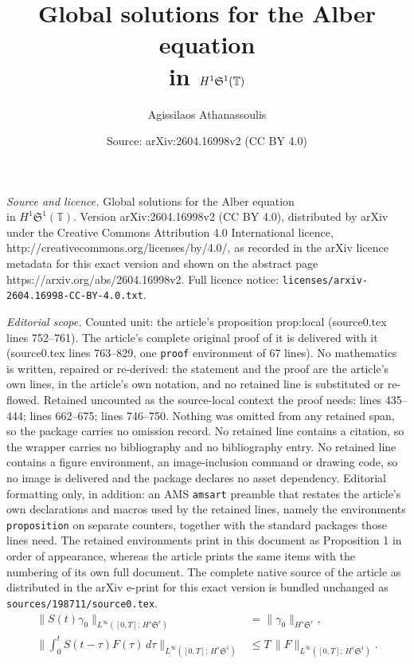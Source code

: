 \documentclass[10pt,a4paper]{amsart}
\title{Global solutions for the Alber equation \\ in $H^1\Sp^1(\mathbb{T})$}
\author{Agissilaos Athanassoulis}
\date{Source: arXiv:2604.16998v2 (CC BY 4.0)}
\newcommand{\Sp}{\mathfrak{S}}
\begin{document}
\maketitle

\noindent\emph{Source and licence.} Global solutions for the Alber equation \\ in $H^1\Sp^1(\mathbb{T})$. Version arXiv:2604.16998v2 (CC BY 4.0), distributed by arXiv under the Creative Commons Attribution 4.0 International licence, http://creativecommons.org/licenses/by/4.0/, as recorded in the arXiv licence metadata for this exact version and shown on the abstract page https://arxiv.org/abs/2604.16998v2. Full licence notice: \texttt{licenses/arxiv-2604.16998-CC-BY-4.0.txt}.\par\smallskip

\noindent\textit{Editorial scope.} Counted unit: the article's proposition prop:local (source0.tex lines 752--761). The article's complete original proof of it is delivered with it (source0.tex lines 763--829, one \texttt{proof} environment of 67 lines). No mathematics is written, repaired or re-derived: the statement and the proof are the article's own lines, in the article's own notation, and no retained line is substituted or re-flowed.  Retained uncounted as the source-local context the proof needs: lines 435--444; lines 662--675; lines 746--750.  Nothing was omitted from any retained span, so the package carries no omission record.  No retained line contains a citation, so the wrapper carries no bibliography and no bibliography entry.  No retained line contains a figure environment, an image-inclusion command or drawing code, so no image is delivered and the package declares no asset dependency.  Editorial formatting only, in addition: an AMS \texttt{amsart} preamble that restates the article's own declarations and macros used by the retained lines, namely the environments \texttt{proposition} on separate counters, together with the standard packages those lines need.  The retained environments print in this document as Proposition 1 in order of appearance, whereas the article prints the same items with the numbering of its own full document.  The complete native source of the article as distributed in the arXiv e-print for this exact version is bundled unchanged as \texttt{sources/198711/source0.tex}.
\begin{align}
  \|S(t)\gamma_0\|_{L^\infty([0,T];\,H^s\Sp^r)}
  &= \|\gamma_0\|_{H^s\Sp^r},
  \label{eq:free_iso}\\[4pt]
  \biggl\|\int_0^t S(t-\tau)F(\tau)\,d\tau
  \biggr\|_{L^\infty([0,T];\,H^s\Sp^1)}
  &\le T\,
  \|F\|_{L^\infty([0,T];\,H^s\Sp^1)}.
  \label{eq:Duh_Linfty}
\end{align}
\end{document}

